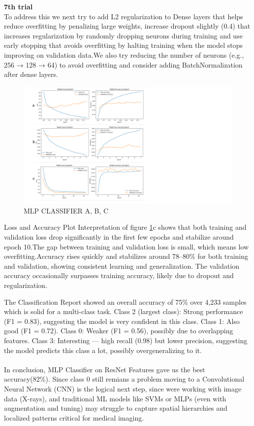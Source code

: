 \documentclass{article}
\begin{document}
\textbf{7th trial}\\
To address this we next try to add L2 regularization to Dense layers that helps reduce overfitting by penalizing large weights, increase dropout slightly (0.4) that increases regularization by randomly dropping neurons during training and use early stopping that avoids overfitting by halting training when the model stops improving on validation data.We also try reducing the number of neurons (e.g., 256 → 128 → 64) to avoid overfitting and consider adding BatchNormalization after dense layers.
\begin{figure}[ht] %
    \centering
    \includegraphics[width=1.0\linewidth]{comparemlp2.png}
    \caption{MLP CLASSIFIER A, B, C}
    \label{fig:MLP_CLASSIFIER_compare}
\end{figure}

Loss and Accuracy Plot Interpretation of figure \ref{fig:MLP_CLASSIFIER_compare}c shows that both training and validation loss drop significantly in the first few epochs and stabilize around epoch 10.The gap between training and validation loss is small, which means low overfitting.Accuracy rises quickly and stabilizes around 78–80\% for both training and validation, showing consistent learning and generalization.
The validation accuracy occasionally surpasses training accuracy, likely due to dropout and regularization.

The Classification Report showed an overall accuracy of 75\% over 4,233 samples which is solid for a multi-class task.
Class 2 (largest class): Strong performance (F1 = 0.83), suggesting the model is very confident in this class.
Class 1: Also good (F1 = 0.72).
Class 0: Weaker (F1 = 0.56), possibly due to overlapping features.
Class 3: Interesting — high recall (0.98) but lower precision, suggesting the model predicts this class a lot, possibly overgeneralizing to it.\\
\\
In conclusion, MLP Classifier on ResNet Features gave us the best accuracy(82\%). Since class 0 still remians a problem moving to a Convolutional Neural Network (CNN) is the logical next step, since were working with image data (X-rays), and traditional ML models like SVMs or MLPs (even with augmentation and tuning) may struggle to capture spatial hierarchies and localized patterns critical for medical imaging.\\
\end{document}
